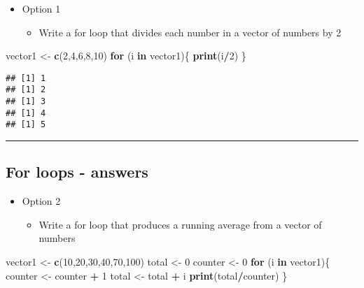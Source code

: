 \documentclass[]{article}
\newenvironment{Shaded}{\begin{snugshade}}{\end{snugshade}}
\newcommand{\ControlFlowTok}[1]{\textcolor[rgb]{0.13,0.29,0.53}{\textbf{#1}}}
\newcommand{\DecValTok}[1]{\textcolor[rgb]{0.00,0.00,0.81}{#1}}
\newcommand{\KeywordTok}[1]{\textcolor[rgb]{0.13,0.29,0.53}{\textbf{#1}}}
\newcommand{\NormalTok}[1]{#1}
\newcommand{\OperatorTok}[1]{\textcolor[rgb]{0.81,0.36,0.00}{\textbf{#1}}}
\newcommand{\StringTok}[1]{\textcolor[rgb]{0.31,0.60,0.02}{#1}}
\providecommand{\tightlist}{%
  \setlength{\itemsep}{0pt}\setlength{\parskip}{0pt}}
\begin{document}
\begin{itemize}
\tightlist
\item
  Option 1

  \begin{itemize}
  \tightlist
  \item
    Write a for loop that divides each number in a vector of numbers by
    2
  \end{itemize}
\end{itemize}

\begin{Shaded}
\begin{Highlighting}[]
\NormalTok{vector1 <-}\StringTok{ }\KeywordTok{c}\NormalTok{(}\DecValTok{2}\NormalTok{,}\DecValTok{4}\NormalTok{,}\DecValTok{6}\NormalTok{,}\DecValTok{8}\NormalTok{,}\DecValTok{10}\NormalTok{)}
\ControlFlowTok{for}\NormalTok{ (i }\ControlFlowTok{in}\NormalTok{ vector1)\{}
  \KeywordTok{print}\NormalTok{(i}\OperatorTok{/}\DecValTok{2}\NormalTok{)}
\NormalTok{\}}
\end{Highlighting}
\end{Shaded}

\begin{verbatim}
## [1] 1
## [1] 2
## [1] 3
## [1] 4
## [1] 5
\end{verbatim}

\begin{center}\rule{0.5\linewidth}{\linethickness}\end{center}

\hypertarget{for-loops---answers-1}{%
\subsection{For loops - answers}\label{for-loops---answers-1}}

\begin{itemize}
\tightlist
\item
  Option 2

  \begin{itemize}
  \tightlist
  \item
    Write a for loop that produces a running average from a vector of
    numbers
  \end{itemize}
\end{itemize}

\begin{Shaded}
\begin{Highlighting}[]
\NormalTok{vector1 <-}\StringTok{ }\KeywordTok{c}\NormalTok{(}\DecValTok{10}\NormalTok{,}\DecValTok{20}\NormalTok{,}\DecValTok{30}\NormalTok{,}\DecValTok{40}\NormalTok{,}\DecValTok{70}\NormalTok{,}\DecValTok{100}\NormalTok{)}
\NormalTok{total <-}\StringTok{ }\DecValTok{0}
\NormalTok{counter <-}\StringTok{ }\DecValTok{0}
\ControlFlowTok{for}\NormalTok{ (i }\ControlFlowTok{in}\NormalTok{ vector1)\{}
\NormalTok{  counter <-}\StringTok{ }\NormalTok{counter }\OperatorTok{+}\StringTok{ }\DecValTok{1}
\NormalTok{  total <-}\StringTok{ }\NormalTok{total }\OperatorTok{+}\StringTok{ }\NormalTok{i}
 \KeywordTok{print}\NormalTok{(total}\OperatorTok{/}\NormalTok{counter)}
\NormalTok{\}}
\end{Highlighting}
\end{Shaded}
\end{document}
